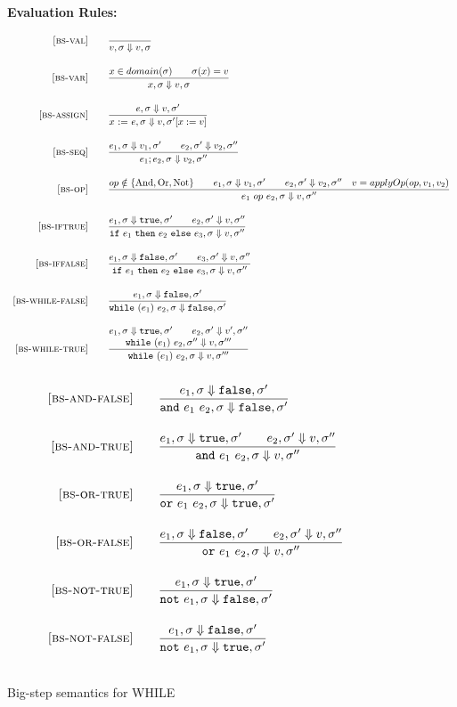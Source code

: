 \documentclass{article}
\makeatletter
\newcommand{\assign}[2]{#1~{:=}~#2}
\newcommand{\ife}[3]{\mbox{\tt if}~{#1}~\mbox{\tt then}~{#2}~\mbox{\tt else}~{#3}}
\newcommand{\whilee}[2]{\mbox{\tt while}~(#1)~#2}
\newcommand{\true}{\mbox{\tt true}}
\newcommand{\false}{\mbox{\tt false}}
\newcommand{\rel}[1]{ \mbox{\sc [#1]} }
\newcommand{\bstep}[4]{{#1},{#2} \Downarrow {#3},{#4}}
\newcommand{\bsrule}[3]{
  \rel{#1} &
  \frac{\strut\begin{array}{@{}c@{}} #2 \end{array}}
       {\strut\begin{array}{@{}c@{}} #3 \end{array}}
   \\~\\
}
\newcommand{\ande}[2]{\mbox{\tt and}~{#1}~{#2}}
\newcommand{\ore}[2]{\mbox{\tt or}~{#1}~{#2}}
\newcommand{\note}[1]{\mbox{\tt not}~{#1}}
\makeatother
\begin{document}
\begin{figure}[H]\label{fig:bigstep}
\caption{Big-step semantics for WHILE}
{\bf Evaluation Rules:~~~ \fbox{$\bstep{e}{\sigma}{v}{\sigma'}$}} \\
\[
\begin{array}{r@{\qquad}l}
\bsrule{bs-val}{
}{
  \bstep{v}{\sigma}{v}{\sigma}
}
\bsrule{bs-var}{
  x \in domain(\sigma) \qquad \sigma(x)=v
}{
  \bstep{x}{\sigma}{v}{\sigma}
}
\bsrule{bs-assign}{
  \bstep{e}{\sigma}{v}{\sigma'}
}{
  \bstep{\assign{x}{e}}{\sigma}{v}{\sigma'[x:=v]}
}
\bsrule{bs-seq}{
  \bstep{e_1}{\sigma}{v_1}{\sigma'} \qquad
  \bstep{e_2}{\sigma'}{v_2}{\sigma''}
}{
  \bstep{e_1;e_2}{\sigma}{v_2}{\sigma''}
}
\bsrule{bs-op}{
  op \notin \{\text{And},\text{Or},\text{Not}\} \qquad
  \bstep{e_1}{\sigma}{v_1}{\sigma'} \qquad
  \bstep{e_2}{\sigma'}{v_2}{\sigma''} \quad
  v = applyOp(op, v_1, v_2)
}{
  \bstep{e_1~op~e_2}{\sigma}{v}{\sigma''}
}
\bsrule{bs-iftrue}{
  \bstep{e_1}{\sigma}{\true}{\sigma'} \qquad
  \bstep{e_2}{\sigma'}{v}{\sigma''}
}{
  \bstep{\ife{e_1}{e_2}{e_3}}{\sigma}{v}{\sigma''}
}
\bsrule{bs-iffalse}{
  \bstep{e_1}{\sigma}{\false}{\sigma'} \qquad
  \bstep{e_3}{\sigma'}{v}{\sigma''}
}{
  \bstep{\ife{e_1}{e_2}{e_3}}{\sigma}{v}{\sigma''}
}
\bsrule{bs-while-false}{
  \bstep{e_1}{\sigma}{\false}{\sigma'}
}{
  \bstep{\whilee{e_1}{e_2}}{\sigma}{\false}{\sigma'}
}
\bsrule{bs-while-true}{
  \bstep{e_1}{\sigma}{\true}{\sigma'} \qquad
  \bstep{e_2}{\sigma'}{v'}{\sigma''} \\
  \bstep{\whilee{e_1}{e_2}}{\sigma''}{v}{\sigma'''}
}{
  \bstep{\whilee{e_1}{e_2}}{\sigma}{v}{\sigma'''}
}
\end{array}
\]
\[
\begin{array}{r@{\qquad}l}
\bsrule{bs-and-false}{
  \bstep{e_1}{\sigma}{\false}{\sigma'}
}{
  \bstep{\ande{e_1}{e_2}}{\sigma}{\false}{\sigma'}
}
\bsrule{bs-and-true}{
  \bstep{e_1}{\sigma}{\true}{\sigma'} \qquad
  \bstep{e_2}{\sigma'}{v}{\sigma''}
}{
  \bstep{\ande{e_1}{e_2}}{\sigma}{v}{\sigma''}
}
\bsrule{bs-or-true}{
  \bstep{e_1}{\sigma}{\true}{\sigma'}
}{
  \bstep{\ore{e_1}{e_2}}{\sigma}{\true}{\sigma'}
}
\bsrule{bs-or-false}{
  \bstep{e_1}{\sigma}{\false}{\sigma'} \qquad
  \bstep{e_2}{\sigma'}{v}{\sigma''}
}{
  \bstep{\ore{e_1}{e_2}}{\sigma}{v}{\sigma''}
}
\bsrule{bs-not-true}{
  \bstep{e_1}{\sigma}{\true}{\sigma'}
}{
  \bstep{\note{e_1}}{\sigma}{\false}{\sigma'}
}
\bsrule{bs-not-false}{
  \bstep{e_1}{\sigma}{\false}{\sigma'}
}{
  \bstep{\note{e_1}}{\sigma}{\true}{\sigma'}
}
\end{array}
\]
\end{figure}
\end{document}
